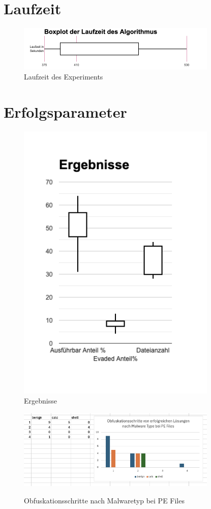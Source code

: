 
\section{Laufzeit}
\begin{figure}[h]
    \centering
    \includegraphics[width=0.85\textwidth]{gfx/Abbildungen/Boxplot der Laufzeit des Algorithmus_CandlestickChart.png}
    \caption{Laufzeit des Experiments}
    \label{fig:result_runtime}
\end{figure}
\section{Erfolgsparameter}
\begin{figure}[h]
    \centering
    \includegraphics[width=0.85\textwidth]{gfx/Abbildungen/Ergebnisse_CandlestickChart.png}
    \caption{Ergebnisse}
    \label{fig:results}
\end{figure}
\begin{figure}[h]
    \centering
    \includegraphics[width=0.85\textwidth]{gfx/Abbildungen/Obfuscation Step Count per Malware PLATZHALTER.png}
    \label{fig:Obfuscationstepcount}
    \caption{Obfuskationsschritte nach Malwaretyp bei PE Files}
\end{figure}
